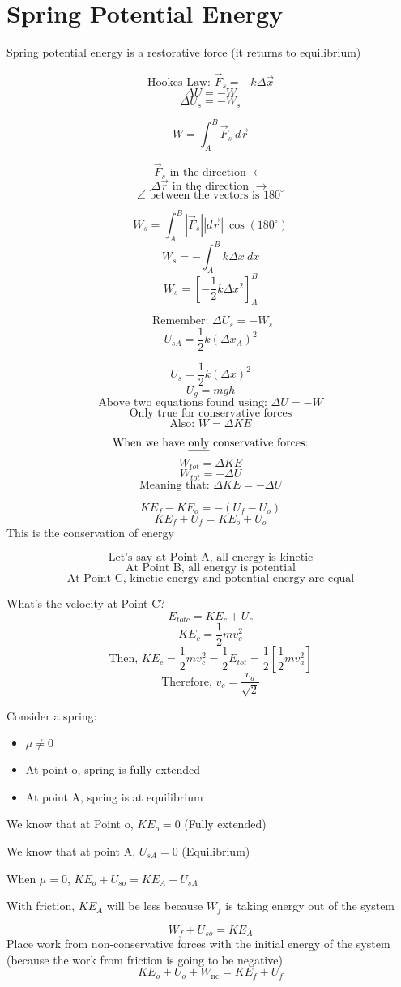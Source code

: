 \documentclass[fleqn]{article}
\begin{document}
\setlength{\mathindent}{0pt}

\section*{Spring Potential Energy}
Spring potential energy is a \underline{restorative force} (it returns to equilibrium)


\[ \text{Hookes Law: } \vec{F}_{s}  = -k \Delta \vec{x} \]
\[ \Delta U=-W \]
\[ \Delta U _{s} = - W _{s}  \]


\[ W = \int_{A}^{B} \vec{F} _{s} \ d \vec{r}  \]

\[ \vec{F} _{s} \text{ in the direction } \leftarrow \]
\[ \Delta \vec{r} \text{ in the direction } \rightarrow \]
\[ \angle \text{ between the vectors is }180 ^{\circ} \]

\[ W _{s} = \int_{A}^{B} |\vec{F} _{s} | |d \vec{r} |\ \cos(180 ^{\circ}) \]
\[ W  _{s} = - \int_{A}^{B} k \Delta x \ dx\]
\[ W _{s} = \left[ -\frac{1}{2} k \Delta x ^2 \right]^B_A \]

\[ \text{ Remember: } \Delta U _{s} = -W _{s}   \]
\[ U _{sA} = \frac{1}{2} k (\Delta x _{A}) ^2 \]

\[ U _{s} = \frac{1}{2} k (\Delta x)^2  \]
\[ U _{g} = mgh \]
\[ \text{Above two equations found using: } \Delta U=-W \]
\[ \text{Only true for conservative forces}  \]
\[ \text{Also: } W = \Delta KE \]

\[ \text{When we have \underline{only} conservative forces:}  \]
\[ W _{tot} = \Delta KE \]
\[ W _{tot} = - \Delta U \]
\[ \text{Meaning that: } \Delta KE = - \Delta U \]

\[ KE _{f} - KE _{o} = - (U _{f} - U _{o} )\]
\[ KE _{f}  + U _{f} = KE _{o}  + U _{o}  \]
{This is the conservation of energy}

\[ \text{Let's say at Point A, all energy is kinetic}  \]
\[ \text{At Point B, all energy is potential}  \]
\[ \text{At Point C, kinetic energy and potential energy are equal}  \]

What's the velocity at Point C?
\[ E _{totc} = KE _{c} + U _{c}  \]
\[ KE _{c} = \frac{1}{2} mv_c^2 \]
\[ \text{Then, } KE_c= \frac{1}{2} mv_c ^2 = \frac{1}{2} E _{tot}  = \frac{1}{2} \left[ \frac{1}{2} mv _{a} ^2  \right]\]
\[ \text{Therefore, } v_c = \frac{v_a}{\sqrt{2} }  \]

Consider a spring:
\begin{itemize}
	\item $\mu \ne 0$
	\item At point o, spring is fully extended
	\item At point A, spring is at equilibrium
\end{itemize}

We know that at Point o, $KE_o=0$ (Fully extended)

We know that at point A, $U_{sA}=0$ (Equilibrium)

When $\mu=0$, $KE_o + U_{so} = KE_A + U_{sA}$

With friction, $KE_A$ will be less because $W_f$ is taking energy out of the system

\[ W_f+U _{so} =KE_A \]
Place work from non-conservative forces with the initial energy of the system (because the work from friction is going to be negative)
\[ KE_o + U_o + W _{\text{nc}} =KE_f + U_f \]
\end{document}
